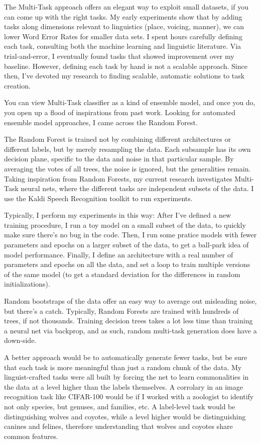 \documentclass[12pt,a4paper]{article}
\begin{document}
The Multi-Task approach offers an elegant way to exploit small datasets, if you can come up with the right tasks. My early experiments show that by adding tasks along dimensions relevant to linguistics (place, voicing, manner), we can lower Word Error Rates for smaller data sets. I spent hours carefully defining each task, consulting both the machine learning and linguistic literature. Via trial-and-error, I eventually found tasks that showed improvement over my baseline. However, defining each task by hand is not a scalable approach. Since then, I've devoted my research to finding scalable, automatic solutions to task creation.

You can view Multi-Task classifier as a kind of ensemble model, and once you do, you open up a flood of inspirations from past work. Looking for automated ensemble model approaches, I came across the Random Forest.

The Random Forest is trained not by combining different architectures or different labels, but by merely resampling the data. Each subsample has its own decision plane, specific to the data and noise in that particular sample. By averaging the votes of all trees, the noise is ignored, but the generalities remain. Taking inspiration from Random Forests, my current research investigates Multi-Task neural nets, where the different tasks are independent subsets of the data. I use the Kaldi Speech Recognition toolkit to run experiments.

Typically, I perform my experiments in this way: After I've defined a new training procedure, I run a toy model on a small subset of the data, to quickly make sure there's no bug in the code. Then, I run some pratice models with fewer parameters and epochs on a larger subset of the data, to get a ball-park idea of model performance. Finally, I define an architecture with a real number of parameters and epochs on all the data, and set a loop to train multiple versions of the same model (to get a standard deviation for the differences in random initializations).


Random bootstraps of the data offer an easy way to average out misleading noise, but there's a catch. Typically, Random Forests are trained with hundreds of trees, if not thousands. Training decision trees takes a lot less time than training a neural net via backprop, and as such, random multi-task generation does have a down-side.

A better approach would be to automatically generate fewer tasks, but be sure that each task is more meaningful than just a random chunk of the data. My linguist-crafted tasks were all built by forcing the net to learn commonalities in the data at a level higher than the labels themselves. A corrolary in an image recognition task like CIFAR-100 would be if I worked with a zoologist to identify not only species, but genuses, and families, etc. A label-level task would be distinguishing wolves and coyotes, while a level higher would be distinguishing canines and felines, therefore understanding that wolves and coyotes share common features.
\end{document}
